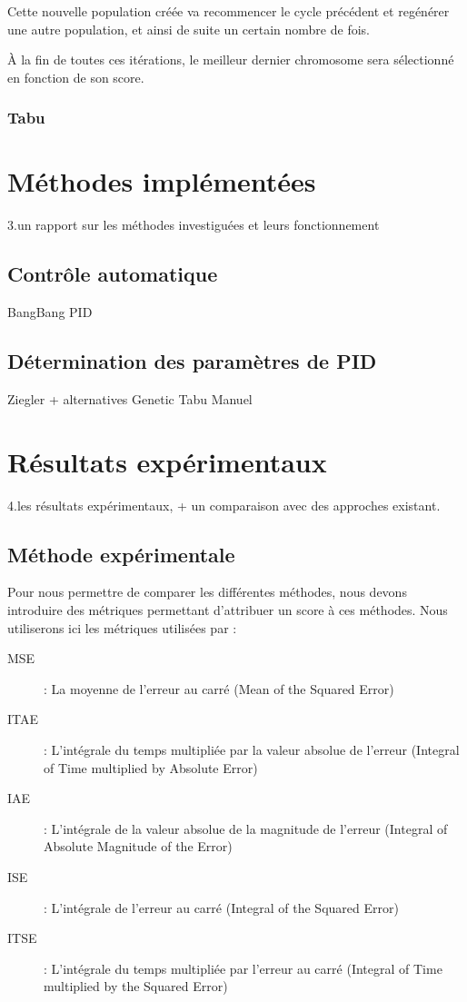 \documentclass[a4paper,10pt]{report}
\begin{document}
Cette nouvelle population créée va recommencer le cycle précédent et regénérer une autre population, et ainsi de suite un certain nombre de fois.

À la fin de toutes ces itérations, le meilleur dernier chromosome sera sélectionné en fonction de son score.

\subsection{Tabu}

\chapter{Méthodes implémentées}
3.un rapport sur les méthodes investiguées et leurs fonctionnement

\section{Contrôle automatique}
BangBang
PID

\section{Détermination des paramètres de PID}

Ziegler + alternatives
Genetic
Tabu
Manuel

\chapter{Résultats expérimentaux}
4.les résultats expérimentaux, + un comparaison avec des approches existant.

\section{Méthode expérimentale}

Pour nous permettre de comparer les différentes méthodes, nous devons introduire des métriques permettant d'attribuer un score à ces méthodes.
Nous utiliserons ici les métriques utilisées par \cite{griffin2003line, mirzal2012pid} :
\begin{description}
    \item[MSE] : La moyenne de l'erreur au carré (Mean of the Squared Error)
    \item[ITAE] : L'intégrale du temps multipliée par la valeur absolue de l'erreur  (Integral of Time multiplied by Absolute Error)
    \item[IAE] : L'intégrale de la valeur absolue de la magnitude de l'erreur (Integral of Absolute Magnitude of the Error)
    \item[ISE] : L'intégrale de l'erreur au carré (Integral of the Squared Error)
    \item[ITSE] : L'intégrale du temps multipliée par l'erreur au carré (Integral of Time multiplied by the Squared Error)
\end{description}
\end{document}
